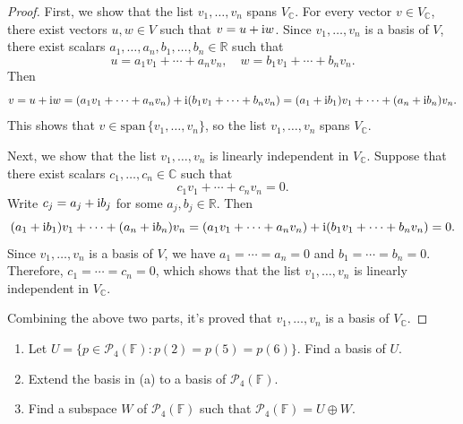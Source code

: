 \documentclass{article}
\newcommand{\sspan}{\text{span}\,}
\begin{document}
\begin{proof}
    First, we show that the list \( v_1, \ldots, v_n \) spans \( V_{\mathbb{C}} \). For every vector \( v \in V_{\mathbb{C}} \), there exist vectors \( u, w \in V \) such that \( v = u + \mathrm{i} w \). Since \( v_1, \ldots, v_n \) is a basis of \( V \), there exist scalars \( a_1, \ldots, a_n, b_1, \ldots, b_n \in \mathbb{R} \) such that
    \[ u = a_1 v_1 + \cdots + a_n v_n, \quad w = b_1 v_1 + \cdots + b_n v_n. \]
    Then
    \[ v = u + \mathrm{i} w = (a_1 v_1 + \cdots + a_n v_n) + \mathrm{i} (b_1 v_1 + \cdots + b_n v_n) = (a_1 + \mathrm{i} b_1) v_1 + \cdots + (a_n + \mathrm{i} b_n) v_n. \]
    This shows that \( v \in \sspan\{v_1, \ldots, v_n\} \), so the list \( v_1, \ldots, v_n \) spans \( V_{\mathbb{C}} \). \par
    Next, we show that the list \( v_1, \ldots, v_n \) is linearly independent in \( V_{\mathbb{C}} \). Suppose that there exist scalars \( c_1, \ldots, c_n \in \mathbb{C} \) such that
    \[ c_1 v_1 + \cdots + c_n v_n = 0. \]
    Write \( c_j = a_j + \mathrm{i} b_j \) for some \( a_j, b_j \in \mathbb{R} \). Then
    \[ (a_1 + \mathrm{i} b_1) v_1 + \cdots + (a_n + \mathrm{i} b_n) v_n = (a_1 v_1 + \cdots + a_n v_n) + \mathrm{i} (b_1 v_1 + \cdots + b_n v_n) = 0. \]
    Since \( v_1, \ldots, v_n \) is a basis of \( V \), we have \( a_1 = \cdots = a_n = 0 \) and \( b_1 = \cdots = b_n = 0 \). Therefore, \( c_1 = \cdots = c_n = 0 \), which shows that the list \( v_1, \ldots, v_n \) is linearly independent in \( V_{\mathbb{C}} \). \par
    Combining the above two parts, it's proved that \( v_1, \ldots, v_n \) is a basis of \( V_{\mathbb{C}} \).
\end{proof}

\begin{problem}[2C-6]
    \begin{enumerate}[label=(\alph*)]
        \item Let \( U = \{p \in \mathcal{P}_4(\mathbb{F}) : p(2) = p(5) = p(6)\} \). Find a basis of \( U \).
        \item Extend the basis in (a) to a basis of \( \mathcal{P}_4(\mathbb{F}) \).
        \item Find a subspace \( W \) of \( \mathcal{P}_4(\mathbb{F}) \) such that \( \mathcal{P}_4(\mathbb{F}) = U \oplus W \).
    \end{enumerate}
\end{problem}
\end{document}
